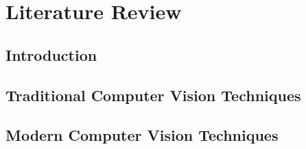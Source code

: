 \chapter{Literature Review}





\section{Introduction}

\section{Traditional Computer Vision Techniques}
 
\section{Modern Computer Vision Techniques}